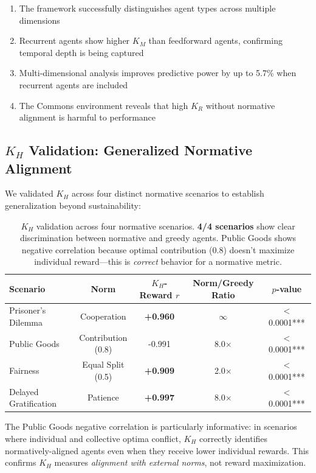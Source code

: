 \documentclass[11pt,a4paper]{article}
\newcommand{\kr}{K_R}
\newcommand{\km}{K_M}
\newcommand{\kh}{K_H}
\begin{document}
\begin{enumerate}
    \item The framework successfully distinguishes agent types across multiple dimensions
    \item Recurrent agents show higher $\km$ than feedforward agents, confirming temporal depth is being captured
    \item Multi-dimensional analysis improves predictive power by up to 5.7\% when recurrent agents are included
    \item The Commons environment reveals that high $\kr$ without normative alignment is harmful to performance
\end{enumerate}

\subsection{$\kh$ Validation: Generalized Normative Alignment}

We validated $\kh$ across four distinct normative scenarios to establish generalization beyond sustainability:

\begin{table}[h]
\centering
\begin{tabular}{lcccc}
\toprule
\textbf{Scenario} & \textbf{Norm} & \textbf{$\kh$-Reward $r$} & \textbf{Norm/Greedy Ratio} & \textbf{$p$-value} \\
\midrule
Prisoner's Dilemma & Cooperation & \textbf{+0.960} & $\infty$ & $<$0.0001*** \\
Public Goods & Contribution (0.8) & -0.991 & 8.0$\times$ & $<$0.0001*** \\
Fairness & Equal Split (0.5) & \textbf{+0.909} & 2.0$\times$ & $<$0.0001*** \\
Delayed Gratification & Patience & \textbf{+0.997} & 8.0$\times$ & $<$0.0001*** \\
\bottomrule
\end{tabular}
\caption{$\kh$ validation across four normative scenarios. \textbf{4/4 scenarios} show clear discrimination between normative and greedy agents. Public Goods shows negative correlation because optimal contribution (0.8) doesn't maximize individual reward---this is \emph{correct} behavior for a normative metric.}
\label{tab:kh-expanded}
\end{table}

The Public Goods negative correlation is particularly informative: in scenarios where individual and collective optima conflict, $\kh$ correctly identifies normatively-aligned agents even when they receive lower individual rewards. This confirms $\kh$ measures \emph{alignment with external norms}, not reward maximization.
\end{document}

